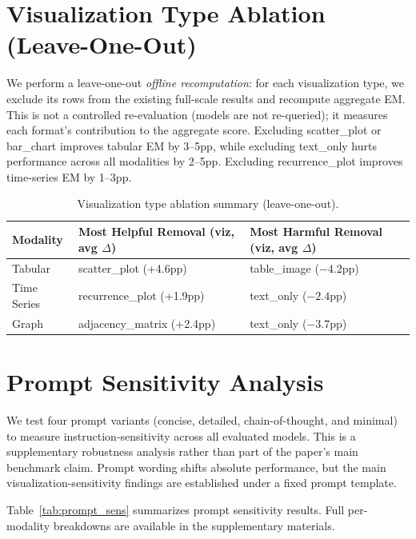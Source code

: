 \documentclass{article}
\begin{document}


\section{Visualization Type Ablation (Leave-One-Out)}
We perform a leave-one-out \emph{offline recomputation}: for each visualization type, we exclude its rows from the existing full-scale results and recompute aggregate EM. This is not a controlled re-evaluation (models are not re-queried); it measures each format's contribution to the aggregate score. Excluding scatter\_plot or bar\_chart improves tabular EM by 3--5pp, while excluding text\_only hurts performance across all modalities by 2--5pp. Excluding recurrence\_plot improves time-series EM by 1--3pp.

\begin{table}[h]
\small
\centering
\begin{tabular}{lll}
\toprule
Modality & Most Helpful Removal (viz, avg $\Delta$) & Most Harmful Removal (viz, avg $\Delta$) \\
\midrule
Tabular & scatter\_plot (+4.6pp) & table\_image ($-4.2$pp) \\
Time Series & recurrence\_plot (+1.9pp) & text\_only ($-2.4$pp) \\
Graph & adjacency\_matrix (+2.4pp) & text\_only ($-3.7$pp) \\
\bottomrule
\end{tabular}
\caption{Visualization type ablation summary (leave-one-out).}
\end{table}

\section{Prompt Sensitivity Analysis}
We test four prompt variants (concise, detailed, chain-of-thought, and minimal) to measure instruction-sensitivity across all evaluated models. This is a supplementary robustness analysis rather than part of the paper's main benchmark claim. Prompt wording shifts absolute performance, but the main visualization-sensitivity findings are established under a fixed prompt template.

\begin{table}[h]
\centering
\caption{Prompt sensitivity ablation results across four instruction variants.}
\label{tab:prompt_sens}
\small
{}
\end{table}
Table~\ref{tab:prompt_sens} summarizes prompt sensitivity results. Full per-modality breakdowns are available in the supplementary materials.
\end{document}
